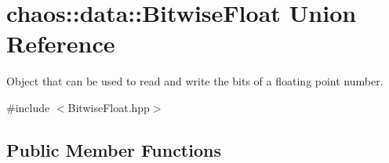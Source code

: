 \hypertarget{unionchaos_1_1data_1_1_bitwise_float}{\section{chaos\-:\-:data\-:\-:Bitwise\-Float Union Reference}
\label{unionchaos_1_1data_1_1_bitwise_float}
}


Object that can be used to read and write the bits of a floating point number.  




{\ttfamily \#include $<$Bitwise\-Float.\-hpp$>$}

\subsection*{Public Member Functions}

